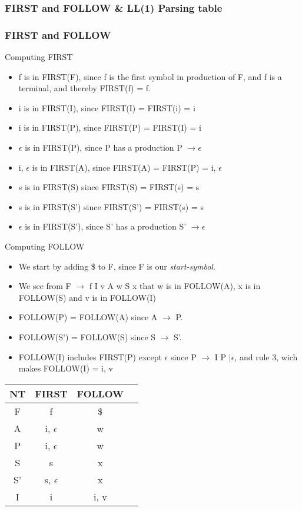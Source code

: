 \documentclass{article}
\begin{document}
\subsubsection{{\ttfamily FIRST} and {\ttfamily FOLLOW} \& LL(1) Parsing table}
\subsubsection*{{\ttfamily FIRST} and {\ttfamily FOLLOW}}
Computing {\ttfamily FIRST}
\begin{itemize}
  \item f is in FIRST(F), since f is the first symbol in production of F, and f
  is a terminal, and thereby FIRST(f) = f.
  \item i is in FIRST(I), since FIRST(I) = FIRST(i) = i
  \item i is in FIRST(P), since FIRST(P) = FIRST(I) = i 
  \item $\epsilon$ is in FIRST(P), since P has a production P $\rightarrow
  \epsilon$
  \item i, $\epsilon$ is in FIRST(A), since FIRST(A) = FIRST(P) = i, $\epsilon$
  \item s is in FIRST(S) since FIRST(S) = FIRST(s) = s 
  \item s is in FIRST(S') since FIRST(S') = FIRST(s) = s 
  \item $\epsilon$ is in FIRST(S'), since S' has a production S' $\rightarrow
  \epsilon$
\end{itemize}
Computing {\ttfamily FOLLOW}
\begin{itemize}
  \item We start by adding \$ to F, since F is our \emph{start-symbol}.
  \item We see from F $\rightarrow$ f I v A w S x that w is in FOLLOW(A), x
  is in FOLLOW(S) and v is in FOLLOW(I)
  \item FOLLOW(P) = FOLLOW(A) since A $\rightarrow$ P. 
  \item FOLLOW(S') = FOLLOW(S) since S $\rightarrow$ S'.
  \item FOLLOW(I) includes FIRST(P) except $\epsilon$ since P $\rightarrow$ I P $|
  \epsilon$, and rule 3, wich makes FOLLOW(I) = i, v
\end{itemize}
\begin{tabular}{|c|c|c|c|}
\hline
NT & FIRST & FOLLOW \\
\hline
\hline
F  & f & \$ \\
A  & i, $\epsilon$ & w \\
P  & i, $\epsilon$ & w \\
S  & s & x \\
S' & s, $\epsilon$ & x \\
I  & i & i, v \\
\hline
\end{tabular}
\end{document}
